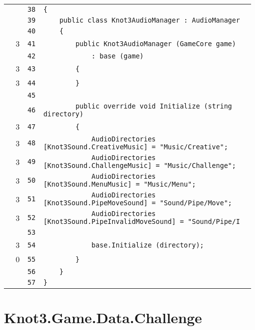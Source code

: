 \documentclass[a4paper,10pt]{article}
\begin{document}
\begin{longtable}[l]{lrrl}
\cellcolor{gray} &  & \verb~38~ & \verb~{~\\
\cellcolor{gray} &  & \verb~39~ & \verb~    public class Knot3AudioManager : AudioManager~\\
\cellcolor{gray} &  & \verb~40~ & \verb~    {~\\
\cellcolor{green} & 3 & \verb~41~ & \verb~        public Knot3AudioManager (GameCore game)~\\
\cellcolor{gray} &  & \verb~42~ & \verb~            : base (game)~\\
\cellcolor{green} & 3 & \verb~43~ & \verb~        {~\\
\cellcolor{green} & 3 & \verb~44~ & \verb~        }~\\
\cellcolor{gray} &  & \verb~45~ & \verb~~\\
\cellcolor{gray} &  & \verb~46~ & \verb~        public override void Initialize (string directory)~\\
\cellcolor{green} & 3 & \verb~47~ & \verb~        {~\\
\cellcolor{green} & 3 & \verb~48~ & \verb~            AudioDirectories [Knot3Sound.CreativeMusic] = "Music/Creative";~\\
\cellcolor{green} & 3 & \verb~49~ & \verb~            AudioDirectories [Knot3Sound.ChallengeMusic] = "Music/Challenge";~\\
\cellcolor{green} & 3 & \verb~50~ & \verb~            AudioDirectories [Knot3Sound.MenuMusic] = "Music/Menu";~\\
\cellcolor{green} & 3 & \verb~51~ & \verb~            AudioDirectories [Knot3Sound.PipeMoveSound] = "Sound/Pipe/Move";~\\
\cellcolor{green} & 3 & \verb~52~ & \verb~            AudioDirectories [Knot3Sound.PipeInvalidMoveSound] = "Sound/Pipe/I~\\
\cellcolor{gray} &  & \verb~53~ & \verb~~\\
\cellcolor{green} & 3 & \verb~54~ & \verb~            base.Initialize (directory);~\\
\cellcolor{red} & 0 & \verb~55~ & \verb~        }~\\
\cellcolor{gray} &  & \verb~56~ & \verb~    }~\\
\cellcolor{gray} &  & \verb~57~ & \verb~}~\\
\end{longtable}
\newpage
\section{Knot3.Game.Data.Challenge}
\end{document}
